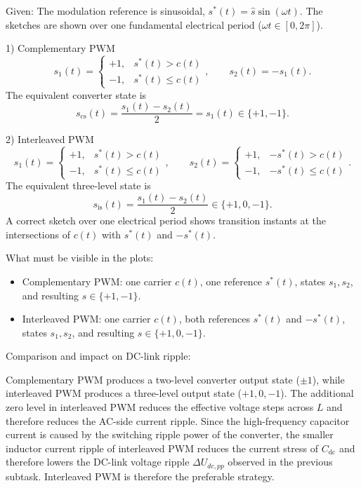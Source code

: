 \begin{solutionblock}
	Given:
	The modulation reference is sinusoidal, $s^*(t)=\hat{s}\sin(\omega t)$. The sketches are shown over one fundamental electrical period ($\omega t\in[0,2\pi]$).

	1) Complementary PWM
	$$s_1(t)=\begin{cases}
			+1, & s^*(t)>c(t)    \\
			-1, & s^*(t)\le c(t)
		\end{cases},\qquad s_2(t)=-s_1(t).$$
	The equivalent converter state is
	$$s_{\mathrm{cs}}(t)=\frac{s_1(t)-s_2(t)}{2}=s_1(t)\in\{+1,-1\}. $$

	2) Interleaved PWM
	$$s_1(t)=\begin{cases}
			+1, & s^*(t)>c(t)    \\
			-1, & s^*(t)\le c(t)
		\end{cases},\qquad
		s_2(t)=\begin{cases}
			+1, & -s^*(t)>c(t)    \\
			-1, & -s^*(t)\le c(t)
		\end{cases}. $$
	The equivalent three-level state is
	$$s_{\mathrm{is}}(t)=\frac{s_1(t)-s_2(t)}{2}\in\{+1,0,-1\}. $$
	A correct sketch over one electrical period shows transition instants at the intersections of $c(t)$ with $s^*(t)$ and $-s^*(t)$.

	What must be visible in the plots:
	\begin{itemize}
		\item Complementary PWM: one carrier $c(t)$, one reference $s^*(t)$, states $s_1,s_2$, and resulting $s\in\{+1,-1\}$.
		\item Interleaved PWM: one carrier $c(t)$, both references $s^*(t)$ and $-s^*(t)$, states $s_1,s_2$, and resulting $s\in\{+1,0,-1\}$.
	\end{itemize}

	
	

	Comparison and impact on DC-link ripple:

	Complementary PWM produces a two-level converter output state ($\pm1$), while interleaved PWM produces a three-level output state ($+1,0,-1$).
	The additional zero level in interleaved PWM reduces the effective voltage steps across $L$ and therefore reduces the AC-side current ripple.
	Since the high-frequency capacitor current is caused by the switching ripple power of the converter,
	the smaller inductor current ripple of interleaved PWM reduces the current stress of $C_{\mathrm{dc}}$
	and therefore lowers the DC-link voltage ripple $\Delta U_{dc,pp}$ observed in the previous subtask.
	Interleaved PWM is therefore the preferable strategy.
	\vfill
\end{solutionblock}
